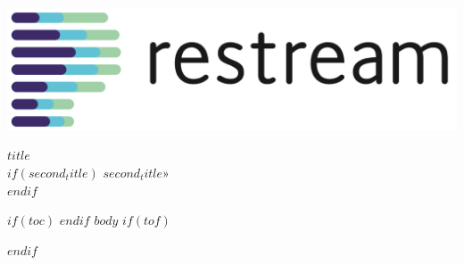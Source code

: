 \documentclass[a4paper,11pt]{article}
\makeatletter
\def\maxwidth{\ifdim\Gin@nat@width>1\linewidth
1\linewidth
\else\Gin@nat@width\fi}
\let\oldincludegraphics\includegraphics %
\renewcommand\includegraphics[2][]{%
  \vspace{8mm}
  \centerline{
  \oldincludegraphics[width=\maxwidth]{#2}
  }
}
\let\zz\[\let\zzz\] %
\let\[\zz\let\]\zzz
\makeatother
\begin{document}
\sloppy %

\begin{titlepage}
    \includegraphics[scale=0.15]{../restream_logo.png}
    \vspace*{\fill}
    \vspace{-5cm}
    \fontsize{30}{30}\headingfontlight\RaggedRight\nohyphens{$title$}\\[0.5cm]
    $if(second_title)$
      \textsc{\fontsize{32}{35}\headingfont\RaggedRight\nohyphens{\noindent{}$second_title$»}}\\
    $endif$ 
    \vfill
    \thispagestyle{titlefooter}
\end{titlepage}

$if(toc)$
  \tableofcontents
  \newpage
$endif$
$body$
$if(tof)$
  \newpage
  \listoffigures
$endif$
\end{document}
